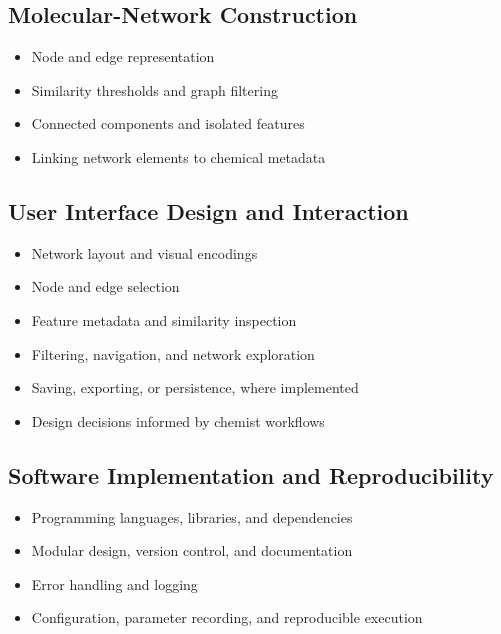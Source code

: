 \documentclass[11pt]{article}
\begin{document}
\begin{doublespace}
    \subsection{Molecular-Network Construction}
        \begin{itemize}
            \item Node and edge representation
            \item Similarity thresholds and graph filtering
            \item Connected components and isolated features
            \item Linking network elements to chemical metadata
        \end{itemize}

    \subsection{User Interface Design and Interaction}
        \begin{itemize}
            \item Network layout and visual encodings
            \item Node and edge selection
            \item Feature metadata and similarity inspection
            \item Filtering, navigation, and network exploration
            \item Saving, exporting, or persistence, where implemented
            \item Design decisions informed by chemist workflows
        \end{itemize}

    \subsection{Software Implementation and Reproducibility}
        \begin{itemize}
            \item Programming languages, libraries, and dependencies
            \item Modular design, version control, and documentation
            \item Error handling and logging
            \item Configuration, parameter recording, and reproducible execution
        \end{itemize}
    

\end{doublespace}
\end{document}
